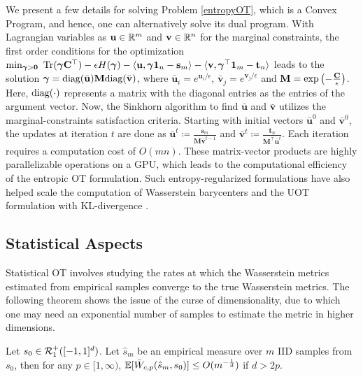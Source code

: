 We present a few details for solving Problem \ref{entropyOT}, which is a Convex Program, and hence, one can alternatively solve its dual program. With Lagrangian variables as $\mathbf{u}\in \mathbb{R}^m$ and $\mathbf{v}\in \mathbb{R}^n$ for the marginal constraints, the first order conditions for the optimization $\min_{\bgamma> \bzero} \ \Tr(\bgamma\bC^\top)-\epsilon H(\bgamma)-\langle \mathbf{u}, \bgamma\bone_n-\mathbf{s}_m \rangle - \langle \mathbf{v}, \bgamma^\top \bone_m - \mathbf{t}_n \rangle$ leads to the solution $\bm{\gamma}=\textup{diag}(\bar{\mathbf{u}})\mathbf{M}\textup{diag}(\bar{\mathbf{v}})$, where $\bar{\mathbf{u}}_i= e^{\mathbf{u}_i/\epsilon}$, $\bar{\mathbf{v}}_j= e^{\mathbf{v}_j/\epsilon}$ and $\mathbf{M}=\exp{\left(-\frac{\mathbf{C}}{\epsilon}\right)}$. Here, $\textup{diag}(\cdot)$ represents a matrix with the diagonal entries as the entries of the argument vector.
Now, the Sinkhorn algorithm to find $\bar{\mathbf{u}}$ and $\bar{\mathbf{v}}$ utilizes the marginal-constraints satisfaction criteria. Starting with initial vectors $\bar{\mathbf{u}}^0$ and $\bar{\mathbf{v}}^0$, the updates at iteration $t$ are done as $\bar{\mathbf{u}}^{t}\coloneqq \frac{\mathbf{s}_m}{\mathbf{M}\bar{\mathbf{v}}^{t-1}}$ and $\bar{\mathbf{v}}^{t}\coloneqq \frac{\mathbf{t}_n}{\mathbf{M}^\top\bar{\mathbf{u}}^{t}}$. Each iteration requires a computation cost of $O(mn)$. These matrix-vector products are highly parallelizable operations on a GPU, which leads to the computational efficiency of the entropic OT formulation. 
Such entropy-regularized formulations have also helped scale the computation of Wasserstein barycenters and the UOT formulation with KL-divergence \citep{ChizatPSV18}.
\resumetoc
\subsection{Statistical Aspects}\label{bg:ot-stats}
Statistical OT involves studying the rates at which the Wasserstein metrics estimated from empirical samples converge to the true Wasserstein metrics. The following theorem shows the issue of the curse of dimensionality, due to which one may need an exponential number of samples to estimate the metric in higher dimensions.
\begin{theorem} Let $s_0\in \mathcal{R}_1^+([-1, 1]^d)$. Let $\hat{s}_m$ be an empirical measure over $m$ IID samples from $s_0$, then for any $p\in [1, \infty)$,
    $\mathbb{E}[\bar{W}_{c, p}(\hat{s}_m, s_0)]\leq O(m^{-\frac{1}{d}})$ if $d>2p$.
\end{theorem}


